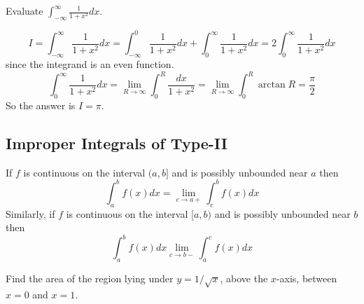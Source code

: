 \documentclass[calc1-main.tex]{subfiles}
\begin{document}
\begin{example}
	Evaluate $\displaystyle \int_{-\infty}^{\infty} \frac{1}{1+x^2} dx$.
\end{example}
\begin{minipage}{0.5\textwidth}
\begin{solution}
	\[
		I =
		\int_{-\infty}^{\infty} \frac{1}{1+x^2} dx =
		\int_{-\infty}^0 \frac{1}{1+x^2} dx + \int_0^{\infty} \frac{1}{1+x^2} dx = 2 \int_0^{\infty} \frac{1}{1+x^2} dx
	\]
	since the integrand is an even function.
	\[
		\int_0^{\infty} \frac{1}{1+x^2} dx =
		\lim_{R \to \infty}\int_0^R \frac{dx}{1+x^2} =
		\lim_{R \to \infty}\int_0^R \arctan R =
		\frac{\pi}{2}
	\]
	So the answer is $I = \pi$.
\end{solution}
\end{minipage}%
\begin{minipage}{0.5\textwidth}
  \begin{figure}[H]
  	\centering
  \end{figure}
\end{minipage}


\subsection*{Improper Integrals of Type-II}
\begin{definition}
	If $f$ is continuous on the interval $(a,b]$ and is possibly unbounded near $a$ then
	\[
		\int_a^b f(x) dx = \lim_{c \to a+} \int_c^b f(x) dx
	\]
	Similarly, if $f$ is continuous on the interval $[a,b)$ and is possibly unbounded near $b$ then
	\[
		\int_a^b f(x) dx \lim_{c \to b-} \int_a^c f(x) dx
	\]
\end{definition}

\begin{example}
	Find the area of the region lying under $y=1/\sqrt{x}$, above the $x$-axis, between $x=0$ and $x=1$.
\end{example}
\end{document}

